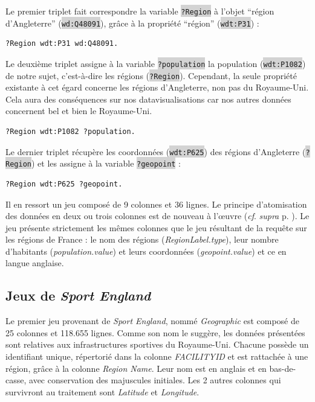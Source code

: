 \documentclass[hidelinks, 12pt]{report}
\newcommand{\code}[1]{\colorbox{LightGray}{\texttt{#1}}}
\begin{document}
Le premier triplet fait correspondre la variable \code{?Region} à l'objet \enquote{région d'Angleterre} (\code{wd:Q48091}), grâce à la propriété \enquote{région} (\code{wdt:P31}) :

\begin{lstlisting}[language=SPARQL]
	?Region wdt:P31 wd:Q48091.
\end{lstlisting}

\label{reng}Le deuxième triplet assigne à la variable \code{?population} la population (\code{wdt:P1082}) de notre sujet, c'est-à-dire les régions (\code{?Region}). Cependant, la seule propriété existante à cet égard concerne les régions d'Angleterre, non pas du Royaume-Uni. Cela aura des conséquences sur nos datavisualisations car nos autres données concernent bel et bien le Royaume-Uni.

\begin{lstlisting}[language=SPARQL]
	?Region wdt:P1082 ?population.
\end{lstlisting}

Le dernier triplet récupère les coordonnées (\code{wdt:P625}) des régions d'Angleterre (\code{?Region}) et les assigne à la variable \code{?geopoint} :

\begin{lstlisting}[language=SPARQL]
	?Region wdt:P625 ?geopoint.
\end{lstlisting}

Il en ressort un jeu composé de 9 colonnes et 36 lignes. Le principe d'atomisation des données en deux ou trois colonnes est de nouveau à l'œuvre (\textit{cf}. \textit{supra} p. \pageref{query1tab}). Le jeu présente strictement les mêmes colonnes que le jeu résultant de la requête sur les régions de France : le nom des régions (\textit{RegionLabel.type}), leur nombre d'habitants (\textit{population.value}) et leurs coordonnées (\textit{geopoint.value}) et ce en langue anglaise.





%





\subsection{Jeux de \textit{Sport England}}

Le premier jeu provenant de \textit{Sport England}, nommé \textit{Geographic} est composé de 25 colonnes et 118.655 lignes. Comme son nom le suggère, les données présentées sont relatives aux infrastructures sportives du Royaume-Uni. Chacune possède un identifiant unique, répertorié dans la colonne \textit{FACILITYID} et est rattachée à une région, grâce à la colonne \textit{Region Name}. Leur nom est en anglais et en bas-de-casse, avec conservation des majuscules initiales. Les 2 autres colonnes qui survivront au traitement sont \textit{Latitude} et \textit{Longitude}.
\end{document}
